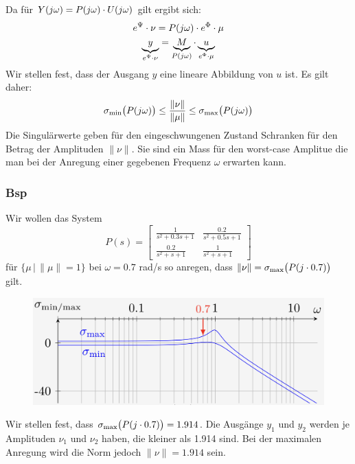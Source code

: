      Da für $Y(j\omega) = P(j\omega)\cdot U(j\omega)$ gilt ergibt sich:
     \begin{gather*}
        e^{\Psi}\cdot\nu = P(j\omega) \cdot e^{\Phi}\cdot \mu\\
        \underbrace{y}_{e^{\Psi}\cdot\nu} = \underbrace{M}_{P(j\omega)} \cdot \underbrace{u}_{e^{\Phi}\cdot \mu}
     \end{gather*}
     Wir stellen fest, dass der Ausgang $y$ eine lineare Abbildung von $u$ ist. Es gilt daher:
     \begin{equation*}
        \sigma_\textnormal{min}\big(P(j\omega)\big) \leq \frac{\|\nu\|}{\|\mu\|} \leq \sigma_\textnormal{max}\big(P(j\omega)\big)
     \end{equation*}
     Die Singulärwerte geben für den eingeschwungenen Zustand Schranken für den Betrag der Amplituden $\|\nu\|$. Sie sind ein Mass für den worst-case Amplitue die man bei der Anregung einer gegebenen Frequenz $\omega$ erwarten kann.
    
    \subsubsection{Bsp}
        Wir wollen das System
        \begin{equation*}
            P(s) = 
            \begin{bmatrix}
                \frac{1}{s^2+0.3s+1} &  \frac{0.2}{s^2+0.5s+1}\\
                \frac{0.2}{s^2+s+1} &   \frac{1}{s^2+s+1}
            \end{bmatrix}
        \end{equation*}
        für $\{\mu \,|\, \|\mu\|=1\}$ bei $\omega = 0.7$ rad/s so anregen, dass $\|\nu\| = \sigma_\textnormal{max}\big(P(j\cdot0.7)\big)$ gilt.
        
        \begin{figure}[H]
            \centering
            \includegraphics[width = 0.5\linewidth]{images/07/singular_val_plot.jpeg}
        \end{figure}
        
        Wir stellen fest, dass $\sigma_\textnormal{max}\big(P(j\cdot0.7)\big) = 1.914$. Die Ausgänge $y_1$ und $y_2$ werden je Amplituden $\nu_1$ und $\nu_2$ haben, die kleiner als 1.914 sind. Bei der maximalen Anregung wird die Norm  jedoch $\|\nu\| = 1.914$ sein.
        
